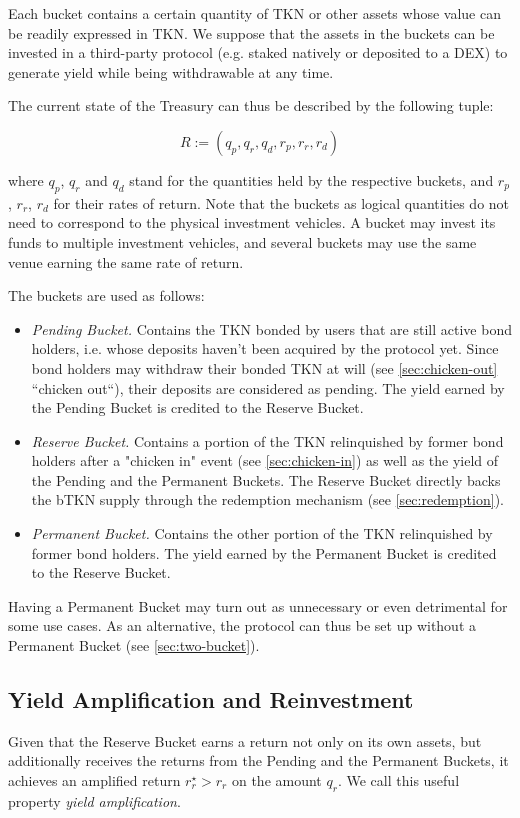\documentclass{article}
\begin{document}
Each bucket contains a certain quantity of TKN or other assets whose value can be readily expressed in TKN. We suppose that the assets in the buckets can be invested in a third-party protocol (e.g. staked natively or deposited to a DEX) to generate yield while being withdrawable at any time. 

The current state of the Treasury can thus be described by the following tuple:

\begin{equation}
  \label{eq:treasury}
    R:=(q_p, q_r, q_d, r_p, r_r, r_d)
\end{equation}

where $q_p$, $q_r$ and $q_d$ stand for the quantities held by the respective buckets, and $r_p$, $r_r$, $r_d$ for their rates of return. Note that the buckets as logical quantities do not need to correspond to the physical investment vehicles. A bucket may invest its funds to multiple investment vehicles, and several buckets may use the same venue earning the same rate of return.

The buckets are used as follows:
\begin{itemize}
    \item \textit{Pending Bucket.} Contains the TKN bonded by users that are still active bond holders, i.e. whose deposits haven’t been acquired by the protocol yet. Since bond holders may withdraw their bonded TKN at will (see \ref{sec:chicken-out} “chicken out“), their deposits are considered as pending. The yield earned by the Pending Bucket is credited to the Reserve Bucket.
    \item \textit{Reserve Bucket.} Contains a portion of the TKN relinquished by former bond holders after a "chicken in" event (see \ref{sec:chicken-in}) as well as the yield of the Pending and the Permanent Buckets. The Reserve Bucket directly backs the bTKN supply through the redemption mechanism (see \ref{sec:redemption}).
    \item \textit{Permanent Bucket.} Contains the other portion of the TKN relinquished by former bond holders. The yield earned by the Permanent Bucket is credited to the Reserve Bucket.
\end{itemize}

Having a Permanent Bucket may turn out as unnecessary or even detrimental for some use cases. As an alternative, the protocol can thus be set up without a Permanent Bucket (see \ref{sec:two-bucket}).

\subsection{Yield Amplification and Reinvestment}
Given that the Reserve Bucket earns a return not only on its own assets, but additionally receives the returns from the Pending and the Permanent Buckets, it achieves an amplified return $r_r^\star > r_r$ on the amount $q_r$. We call this useful property \textit{yield amplification}.
\end{document}
